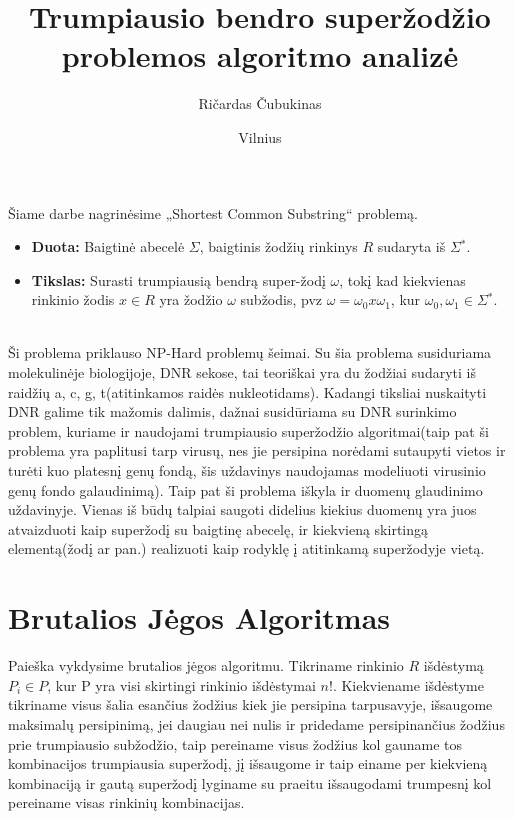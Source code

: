 \documentclass{VUMIFInfKursinis}
\institute{Informatikos institutas}
\title{Trumpiausio bendro superžodžio problemos algoritmo analizė}
\author{Ričardas Čubukinas}
\date{Vilnius \\ \the\year}
\begin{document}
\maketitle

\tableofcontents

Šiame darbe nagrinėsime „Shortest Common Substring“ problemą.
\begin{itemize}
  \item{\textbf{Duota:} Baigtinė abecelė $\Sigma$, baigtinis žodžių rinkinys $R$ sudaryta iš $\Sigma{}^*$.}
  \item{\textbf{Tikslas:} Surasti trumpiausią bendrą super-žodį $\omega$, tokį kad kiekvienas rinkinio žodis $x \in R$ yra žodžio $\omega$ subžodis, pvz $\omega =\omega{}_0x\omega{}_1$, kur $\omega{}_0,\omega{}_1 \in \Sigma{}^*$.}
\end{itemize}\cite{ausiello1999complexity}\\

Ši problema priklauso NP-Hard problemų šeimai. Su šia problema susiduriama molekulinėje biologijoje, DNR sekose, tai teoriškai yra du žodžiai sudaryti iš raidžių {a, c, g, t}(atitinkamos raidės nukleotidams). Kadangi tiksliai nuskaityti DNR galime tik mažomis dalimis, dažnai susidūriama su DNR surinkimo problem, kuriame ir naudojami trumpiausio superžodžio algoritmai(taip pat ši problema yra paplitusi tarp virusų, nes jie persipina norėdami sutaupyti vietos ir turėti kuo platesnį genų fondą, šis uždavinys naudojamas modeliuoti virusinio genų fondo galaudinimą). Taip pat ši problema iškyla ir duomenų glaudinimo uždavinyje. Vienas iš būdų talpiai saugoti didelius kiekius duomenų yra juos atvaizduoti kaip superžodį su baigtinę abecelę, ir kiekvieną skirtingą elementą(žodį ar pan.) realizuoti kaip rodyklę į atitinkamą superžodyje vietą. \cite{ssparticle}


\section{Brutalios Jėgos Algoritmas}
Paieška vykdysime brutalios jėgos algoritmu. Tikriname rinkinio $R$ išdėstymą $P_i \in P$, kur P yra visi skirtingi rinkinio išdėstymai $n!$. Kiekviename išdėstyme tikriname visus šalia esančius žodžius kiek jie persipina tarpusavyje, išsaugome maksimalų persipinimą, jei daugiau nei nulis ir pridedame persipinančius žodžius prie trumpiausio subžodžio, taip pereiname visus žodžius kol gauname tos kombinacijos trumpiausia superžodį, jį išsaugome ir taip einame per kiekvieną kombinaciją ir gautą superžodį lyginame su praeitu išsaugodami trumpesnį kol pereiname visas rinkinių kombinacijas. 
\end{document}
